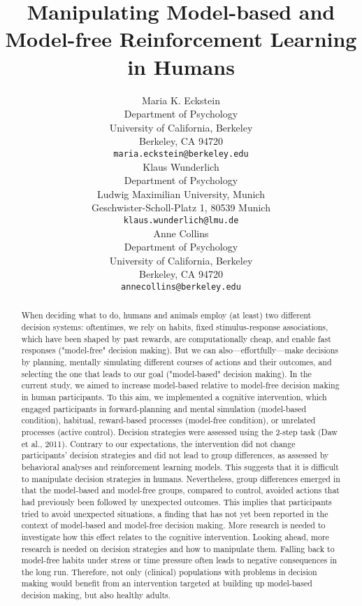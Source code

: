 \documentclass[11pt]{article} %
\title{Manipulating Model-based and Model-free Reinforcement Learning in Humans}
\author{
Maria K. Eckstein \\
Department of Psychology \\
University of California, Berkeley \\
Berkeley, CA 94720 \\
\texttt{maria.eckstein@berkeley.edu} \\
\And
Klaus Wunderlich \\
Department of Psychology \\
Ludwig Maximilian University, Munich \\
Geschwister-Scholl-Platz 1, 80539 Munich \\
\texttt{klaus.wunderlich@lmu.de} \\
\And
Anne Collins \\
Department of Psychology\\
University of California, Berkeley \\
Berkeley, CA 94720  \\
\texttt{annecollins@berkeley.edu} \\
}
\begin{document}
\maketitle

\begin{abstract}
When deciding what to do, humans and animals employ (at least) two different decision systems: oftentimes, we rely on habits, fixed stimulus-response associations, which have been shaped by past rewards, are computationally cheap, and enable fast responses ("model-free" decision making). But we can also---effortfully---make decisions by planning, mentally simulating different courses of actions and their outcomes, and selecting the one that leads to our goal ("model-based" decision making). In the current study, we aimed to increase model-based relative to model-free decision making in human participants. To this aim, we implemented a cognitive intervention, which engaged participants in forward-planning and mental simulation (model-based condition), habitual, reward-based processes (model-free condition), or unrelated processes (active control). Decision strategies were assessed using the 2-step task (Daw et al., 2011). Contrary to our expectations, the intervention did not change participants' decision strategies and did not lead to group differences, as assessed by behavioral analyses and reinforcement learning models. This suggests that it is difficult to manipulate decision strategies in humans. Nevertheless, group differences emerged in that the model-based and model-free groups, compared to control, avoided actions that had previously been followed by unexpected outcomes. This implies that participants tried to avoid unexpected situations, a finding that has not yet been reported in the context of model-based and model-free decision making. More research is needed to investigate how this effect relates to the cognitive intervention. Looking ahead, more research is needed on decision strategies and how to manipulate them. Falling back to model-free habits under stress or time pressure often leads to negative consequences in the long run. Therefore, not only (clinical) populations with problems in decision making would benefit from an intervention targeted at building up model-based decision making, but also healthy adults.
\end{abstract}


\end{document}
